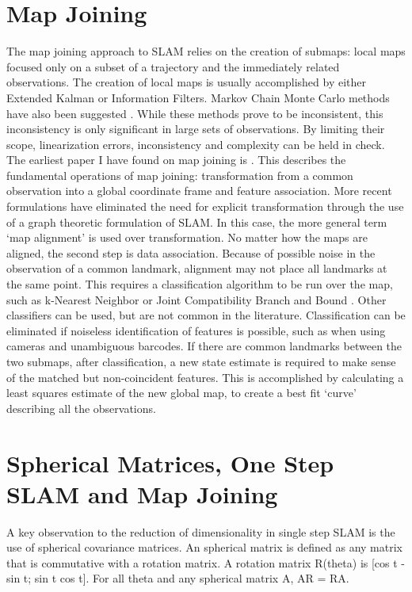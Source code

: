 \documentclass[12pt]{report}
\begin{document}
\section{Map Joining}
The map joining approach to SLAM relies on the creation of submaps: local maps focused only on a subset of a trajectory and the immediately related observations.  The creation of local maps is usually accomplished by either Extended Kalman or Information Filters. Markov Chain Monte Carlo methods have also been suggested .  While these methods prove to be inconsistent, this inconsistency is only significant in large sets of observations.  By limiting their scope, linearization errors, inconsistency and complexity can be held in check.
The earliest paper I have found on map joining is \cite{tardos2002}.  This describes the fundamental operations of map joining: transformation from a common observation into a global coordinate frame and feature association.  More recent formulations \cite{c-sam} have eliminated the need for explicit transformation through the use of a graph theoretic formulation of SLAM.  In this case, the more general term ‘map alignment’ is used over transformation.
No matter how the maps are aligned, the second step is data association.  Because of possible noise in the observation of a common landmark, alignment may not place all landmarks at the same point.  This requires a classification algorithm to be run over the map, such as k-Nearest Neighbor or Joint Compatibility Branch and Bound  \cite{tardos2002}.  Other classifiers can be used, but are not common in the literature.  Classification can be eliminated if noiseless identification of features is possible, such as when using cameras and unambiguous barcodes.
If there are common landmarks between the two submaps, after classification, a new state estimate is required to make sense of the matched but non-coincident features.  This is accomplished by calculating a least squares estimate of the new global map, to create a best fit ‘curve’ describing all the observations.

\section{ Spherical Matrices, One Step SLAM and Map Joining}
A key observation to the reduction of dimensionality in single step SLAM is the 	use of spherical covariance matrices.  An spherical matrix is defined as any matrix that is commutative with a rotation matrix.  A rotation matrix R(theta) is [cos t -sin t; sin t cos t].  For all theta and any spherical matrix A, AR = RA.  
\end{document}
